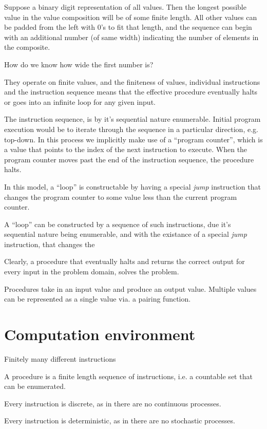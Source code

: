 Suppose a binary digit representation of all values. Then the longest possible
value in the value composition will be of some finite length. All other values
can be padded from the left with $0$'s to fit that length, and the sequence can
begin with an additional number (of same width) indicating the number of
elements in the composite.

How do we know how wide the first number is?

They operate on finite
values, and the finiteness of values, individual instructions and the
instruction sequence means that the effective procedure eventually halts or
goes into an infinite loop for any given input. 

The instruction sequence, is by it's sequential nature enumerable. Initial
program execution would be to iterate through the sequence in a particular
direction, e.g. top-down. In this process we implicitly make use of a ``program
counter'', which is a value that points to the index of the next instruction to
execute. When the program counter moves past the end of the instruction
sequence, the procedure halts.

In this model, a ``loop'' is constructable by having a special \emph{jump}
instruction that changes the program counter to some value less than the
current program counter.

A ``loop'' can be constructed by a sequence of such instructions, due it's
sequential nature being enumerable, and with the existance of a special
\emph{jump} instruction, that changes the 

Clearly, a procedure that eventually halts and returns the correct output for
every input in the problem domain, solves the problem.


Procedures take in an input value and produce an output value. Multiple values
can be represented as a single value via. a pairing function.



\section{Computation environment}

Finitely many different instructions

A procedure is a finite length sequence of instructions, i.e. a countable set
that can be enumerated.

Every instruction is discrete, as in there are no continuous processes.

Every instruction is deterministic, as in there are no stochastic processes.


